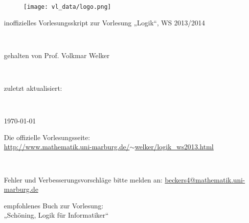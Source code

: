 \documentclass[a4paper, titlepage]{scrartcl}
\begin{document}


\begin{figure}[h]
\centering
\texttt{[image: vl\_data/logo.png]}
\end{figure}

\begin{center}
\begin{huge}inoffizielles Vorlesungsskript zur Vorlesung „Logik“, WS 2013/2014\end{huge}\\
\vspace{1cm}
\begin{large}gehalten von Prof. Volkmar Welker\end{large}\\
\vspace{1cm}
\begin{small}zuletzt aktualisiert:\end{small}\\
\begin{Large}\today \end{Large}
\end{center}

\noindent
\begin{center}
Die offizielle Vorlesungsseite:\\
\href{http://www.mathematik.uni-marburg.de/~welker/logik\_ws2013.html}{http://www.mathematik.uni-marburg.de/$\sim$welker/logik\_ws2013.html}
\end{center}

\noindent\\
\begin{center}\begin{Large}Fehler und Verbesserungsvorschläge bitte melden an: \href{mailto:beckers4@mathematik.uni-marburg.de}{beckers4@mathematik.uni-marburg.de}\end{Large}\end{center}
\vspace{1cm}
\begin{center}
empfohlenes Buch zur Vorlesung:\\
„Schöning, Logik für Informatiker“
\end{center}

\newpage

\tableofcontents

\newpage



\newpage


\newpage


\newpage



\newpage
\renewcommand{\indexname}{Stichwortverzeichnis}
\printindex
\end{document}
